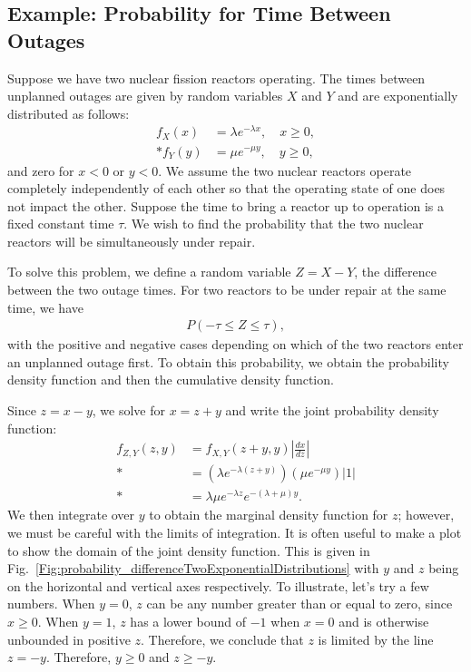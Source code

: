 \subsection{Example: Probability for Time Between Outages}

Suppose we have two nuclear fission reactors operating. The times between unplanned outages are given by random variables $X$ and $Y$ and are exponentially distributed as follows:
\begin{subequations}
\begin{align}
  f_X(x) &= \lambda e^{-\lambda x}, \quad x \ge 0, \\*
  f_Y(y) &= \mu e^{-\mu y}, \quad y \ge 0,
\end{align}
\end{subequations}
and zero for $x < 0$ or $y < 0$. We assume the two nuclear reactors operate completely independently of each other so that the operating state of one does not impact the other. Suppose the time to bring a reactor up to operation is a fixed constant time $\tau$. We wish to find the probability that the two nuclear reactors will be simultaneously under repair. 

To solve this problem, we define a random variable $Z = X - Y$, the difference between the two outage times. For two reactors to be under repair at the same time, we have
\begin{align}
  P( -\tau \le Z \le \tau ) , \nonumber
\end{align}
with the positive and negative cases depending on which of the two reactors enter an unplanned outage first. To obtain this probability, we obtain the probability density function and then the cumulative density function.

Since $z = x - y$, we solve for $x = z + y$ and write the joint probability density function:
\begin{align}
  f_{Z,Y}(z,y) &= f_{X,Y}(z+y,y)  \left| \frac{dx}{dz} \right| \nonumber \\*
               &= ( \lambda e^{-\lambda (z+y)} ) ( \mu e^{-\mu y} ) |1| \nonumber \\*
               &= \lambda \mu e^{-\lambda z} e^{-(\lambda + \mu) y } .
\end{align}
We then integrate over $y$ to obtain the marginal density function for $z$; however, we must be careful with the limits of integration. It is often useful to make a plot to show the domain of the joint density function. This is given in Fig.~\ref{Fig:probability_differenceTwoExponentialDistributions} with $y$ and $z$ being on the horizontal and vertical axes respectively. To illustrate, let's try a few numbers. When $y = 0$, $z$ can be any number greater than or equal to zero, since $x \ge 0$. When $y = 1$, $z$ has a lower bound of $-1$ when $x = 0$ and is otherwise unbounded in positive $z$. Therefore, we conclude that $z$ is limited by the line $z = -y$. Therefore, $y \ge 0$ and $z \ge -y$.


